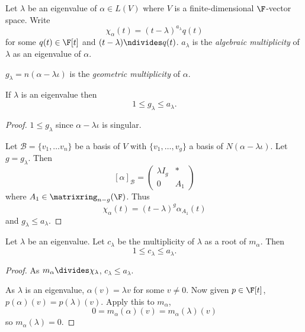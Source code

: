 \documentclass[a4paper]{article}
\newcommand*{\M}{\matrixring}
\newcommand*{\basis}{\mathcal}
\theoremstyle{definition}
\begin{document}
\begin{definition}
  Let \(\lambda\) be an eigenvalue of \(\alpha \in L(V)\) where \(V\) is a finite-dimensional \(\F\)-vector space. Write
  \[
    \chi_\alpha(t) = (t - \lambda)^{a_\lambda} q(t)
  \]
  for some \(q(t) \in \F[t]\) and \((t - \lambda) \ndivides q(t)\). \(a_\lambda\) is the \emph{algebraic multiplicity} of \(\lambda\) as an eigenvalue of \(\alpha\).
\end{definition}

\begin{definition}
  \(g_\lambda = n(\alpha - \lambda \iota)\) is the \emph{geometric multiplicity} of \(\alpha\).
\end{definition}

\begin{lemma}
  If \(\lambda\) is an eigenvalue then
  \[
    1 \leq g_\lambda \leq a_\lambda.
  \]
\end{lemma}

\begin{proof}
  \(1 \leq g_\lambda\) since \(\alpha - \lambda \iota\) is singular.

  Let \(\basis B = \{v_1, \dots v_n\}\) be a basis of \(V\) with \(\{v_1, \dots, v_g\}\) a basis of \(N(\alpha - \lambda \iota)\). Let \(g = g_\lambda\). Then
  \[
    [\alpha]_{\basis B} =
    \begin{pmatrix}
      \lambda I_g & * \\
      0 & A_1
    \end{pmatrix}
  \]
  where \(A_1 \in \M_{n - g}(\F)\). Thus
  \[
    \chi_\alpha(t) = (t - \lambda)^g \alpha_{A_1}(t)
  \]
  and \(g_\lambda \leq a_\lambda\).
\end{proof}

\begin{lemma}
  Let \(\lambda\) be an eigenvalue. Let \(c_\lambda\) be the multiplicity of \(\lambda\) as a root of \(m_\alpha\). Then
  \[
    1 \leq c_\lambda \leq a_\lambda.
  \]
\end{lemma}

\begin{proof}
  As \(m_\alpha \divides \chi_\lambda\), \(c_\lambda \leq a_\lambda\).

  As \(\lambda\) is an eigenvalue, \(\alpha(v) = \lambda v\) for some \(v \neq 0\). Now given \(p \in \F[t]\), \(p(\alpha)(v) = p(\lambda)(v)\). Apply this to \(m_\alpha\),
  \[
    0 = m_\alpha(\alpha)(v) = m_\alpha(\lambda)(v)
  \]
  so \(m_\alpha(\lambda) = 0\).
\end{proof}
\end{document}

